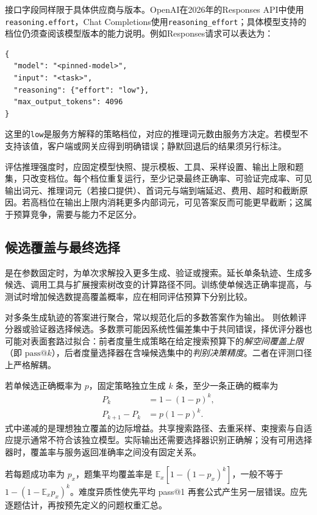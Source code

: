 \documentclass[../textbook.tex]{subfiles}
\begin{document}
接口字段同样限于具体供应商与版本。OpenAI在2026年的Responses API中使用\texttt{reasoning.effort}，Chat Completions使用\texttt{reasoning\_effort}；具体模型支持的档位仍须查阅该模型版本的能力说明\cite{openai2026modelguidance}。例如Responses请求可以表达为：
\begin{verbatim}
{
  "model": "<pinned-model>",
  "input": "<task>",
  "reasoning": {"effort": "low"},
  "max_output_tokens": 4096
}
\end{verbatim}
这里的\texttt{low}是服务方解释的策略档位，对应的推理词元数由服务方决定。若模型不支持该值，客户端或网关应得到明确错误；静默回退后的结果须另行标注。

评估推理强度时，应固定模型快照、提示模板、工具、采样设置、输出上限和题集，只改变档位。每个档位重复运行，至少记录最终正确率、可验证完成率、可见输出词元、推理词元（若接口提供）、首词元与端到端延迟、费用、超时和截断原因。若高档位在输出上限内消耗更多内部词元，可见答案反而可能更早截断；这属于预算竞争，需要与能力不足区分。

\subsection{候选覆盖与最终选择}
是在参数固定时，为单次求解投入更多生成、验证或搜索。延长单条轨迹、生成多候选、调用工具与扩展搜索树改变的计算路径不同。训练使单候选正确率提高，与测试时增加候选数提高覆盖概率，应在相同评估预算下分别比较。

对多条生成轨迹的答案进行聚合，常以规范化后的多数答案作为输出。\cite{wang2022selfconsistency} 则依赖评分器或验证器选择候选。多数票可能因系统性偏差集中于共同错误，择优评分器也可能对表面套路过拟合：前者度量生成策略在给定搜索预算下的\emph{解空间覆盖上限}（即 $\mathrm{pass@}k$），后者度量选择器在含噪候选集中的\emph{判别决策精度}。二者在评测口径上严格解耦。

若单候选正确概率为 $p$，固定策略独立生成 $k$ 条，至少一条正确的概率为
\begin{equation}
\begin{aligned}
 P_k &= 1-(1-p)^k, \\
 P_{k+1}-P_k &= p(1-p)^k.
\end{aligned}
\end{equation}
式中递减的是理想独立覆盖的边际增益。共享搜索路径、去重采样、束搜索与自适应提示通常不符合该独立模型。实际输出还需要选择器识别正确解；没有可用选择器时，覆盖率与服务返回准确率之间没有固定关系。

若每题成功率为 $p_x$，题集平均覆盖率是 $\mathbb E_x[1-(1-p_x)^k]$，一般不等于 $1-(1-\mathbb E_xp_x)^k$。难度异质性使先平均 pass@1 再套公式产生另一层错误。应先逐题估计，再按预先定义的问题权重汇总。
\end{document}
